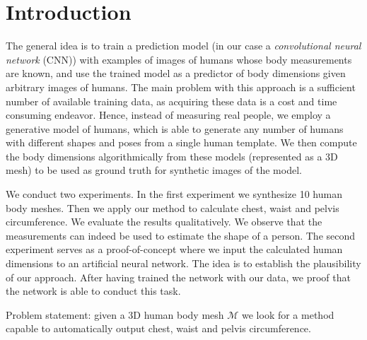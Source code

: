 \documentclass[10pt,twocolumn,letterpaper]{article}
\begin{document}
\section{Introduction}

The general idea is to train a prediction model (in our case a {\em 
convolutional neural network} (CNN)) with examples of images of humans whose 
body measurements are known, and use the trained model as a predictor of body 
dimensions given arbitrary images of humans. The main problem with this 
approach is a sufficient number of available training data, as acquiring these 
data is a cost and time consuming endeavor. Hence, instead of measuring real 
people, we employ a generative model of humans, which is able to generate any 
number of humans with different shapes and poses from a single human template. 
We then compute the body dimensions algorithmically from these models 
(represented as a 3D mesh) to be used as ground truth for synthetic images of 
the model.

We conduct two experiments. In the first experiment we synthesize 10 human body meshes. Then we apply our method to calculate chest, waist and pelvis circumference. We evaluate the results qualitatively. We observe that the measurements can indeed be used to estimate the shape of a person. The second experiment serves as a proof-of-concept where we input the calculated human dimensions to an artificial neural network. The idea is to establish the plausibility of our approach. After having trained the network with our data, we proof that the network is able to conduct this task.

Problem statement: given a 3D human body mesh $\mathcal{M}$ we look for a 
method capable to automatically output chest, waist and pelvis circumference.

\end{document}
